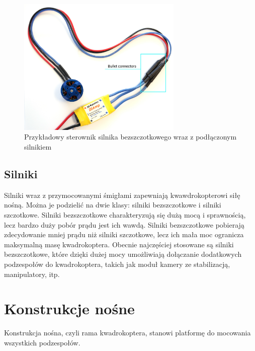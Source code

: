 \begin{figure}[H]
	\centering
		\includegraphics[width=0.7\textwidth]{Pictures/esc-motor-connect.jpg}
	\caption[Przykładowy sterownik silnika bezszczotkowego]{Przykładowy sterownik silnika bezszczotkowego wraz z podłączonym silnikiem}
	\label{fig:esc-motor-connect.jpg}
\end{figure}


\subsection{Silniki}

Silniki wraz z przymocowanymi śmigłami zapewniają kwawdrokopterowi siłę nośną. Można je podzielić na dwie klasy: silniki bezszczotkowe i silniki szczotkowe. Silniki bezszczotkowe charakteryzują się dużą mocą i sprawnością, lecz bardzo duży pobór prądu jest ich wawdą. Silniki bezszczotkowe pobierają zdecydowanie mniej prądu niż silniki szczotkowe, lecz ich mała moc ogranicza maksymalną masę kwadrokoptera. Obecnie najczęściej stosowane są silniki bezszczotkowe, które dzięki dużej mocy umożliwiają dołączanie dodatkowych podzespołów do kwadrokoptera, takich jak moduł kamery ze stabilizacją, manipulatory, itp.


\section{Konstrukcje nośne}

Konstrukcja nośna, czyli rama kwadrokoptera, stanowi platformę do mocowania wszystkich podzespołów. 

